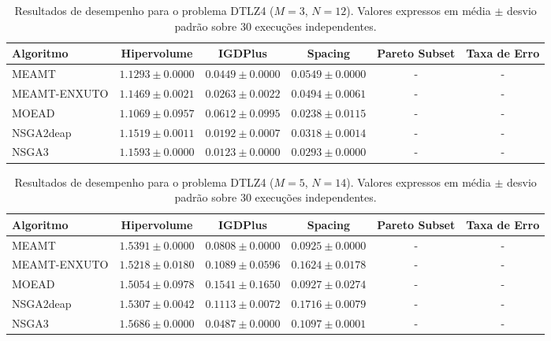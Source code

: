 \begin{table}[htpb]
\centering
\caption{Resultados de desempenho para o problema DTLZ4 ($M=3$, $N=12$). Valores expressos em média $\pm$ desvio padrão sobre 30 execuções independentes.}
\label{tab:DTLZ4_M3_N12}
\begin{tabular}{lccccc}
\hline\hline
Algoritmo & Hipervolume & IGDPlus & Spacing & Pareto Subset & Taxa de Erro \\
\hline
MEAMT & $1.1293 \pm 0.0000$ & $0.0449 \pm 0.0000$ & $0.0549 \pm 0.0000$ & - & - \\
MEAMT-ENXUTO & $1.1469 \pm 0.0021$ & $0.0263 \pm 0.0022$ & $0.0494 \pm 0.0061$ & - & - \\
MOEAD & $1.1069 \pm 0.0957$ & $0.0612 \pm 0.0995$ & $0.0238 \pm 0.0115$ & - & - \\
NSGA2deap & $1.1519 \pm 0.0011$ & $0.0192 \pm 0.0007$ & $0.0318 \pm 0.0014$ & - & - \\
NSGA3 & $1.1593 \pm 0.0000$ & $0.0123 \pm 0.0000$ & $0.0293 \pm 0.0000$ & - & - \\
\hline\hline
\end{tabular}
\end{table}

\begin{table}[htpb]
\centering
\caption{Resultados de desempenho para o problema DTLZ4 ($M=5$, $N=14$). Valores expressos em média $\pm$ desvio padrão sobre 30 execuções independentes.}
\label{tab:DTLZ4_M5_N14}
\begin{tabular}{lccccc}
\hline\hline
Algoritmo & Hipervolume & IGDPlus & Spacing & Pareto Subset & Taxa de Erro \\
\hline
MEAMT & $1.5391 \pm 0.0000$ & $0.0808 \pm 0.0000$ & $0.0925 \pm 0.0000$ & - & - \\
MEAMT-ENXUTO & $1.5218 \pm 0.0180$ & $0.1089 \pm 0.0596$ & $0.1624 \pm 0.0178$ & - & - \\
MOEAD & $1.5054 \pm 0.0978$ & $0.1541 \pm 0.1650$ & $0.0927 \pm 0.0274$ & - & - \\
NSGA2deap & $1.5307 \pm 0.0042$ & $0.1113 \pm 0.0072$ & $0.1716 \pm 0.0079$ & - & - \\
NSGA3 & $1.5686 \pm 0.0000$ & $0.0487 \pm 0.0000$ & $0.1097 \pm 0.0001$ & - & - \\
\hline\hline
\end{tabular}
\end{table}

